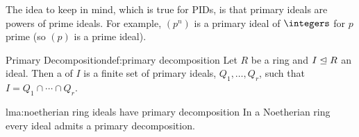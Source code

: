 The idea to keep in mind, which is true for PIDs, is that primary ideals are powers of prime ideals.
For example, \((p^n)\) is a primary ideal of \(\integers\) for \(p\) prime (so \((p)\) is a prime ideal).

\begin{dfn}{Primary Decomposition}{def:primary decomposition}
    Let \(R\) be a ring and \(I \trianglelefteq R\) an ideal.
    Then a  of \(I\) is a finite set of primary ideals, \(Q_1, \dotsc, Q_r\), such that \(I = Q_1 \cap \dotsb \cap Q_r\).
\end{dfn}

\begin{lma}{}{lma:noetherian ring ideals have primary decomposition}
    In a Noetherian ring every ideal admits a primary decomposition.
\end{lma}

